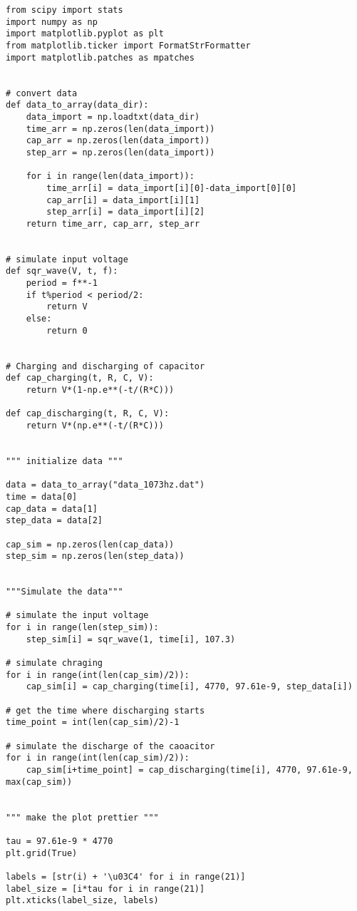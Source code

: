 \begin{verbatim}
from scipy import stats
import numpy as np
import matplotlib.pyplot as plt
from matplotlib.ticker import FormatStrFormatter
import matplotlib.patches as mpatches


# convert data
def data_to_array(data_dir): 
    data_import = np.loadtxt(data_dir)
    time_arr = np.zeros(len(data_import))
    cap_arr = np.zeros(len(data_import))
    step_arr = np.zeros(len(data_import))

    for i in range(len(data_import)):
        time_arr[i] = data_import[i][0]-data_import[0][0]
        cap_arr[i] = data_import[i][1]
        step_arr[i] = data_import[i][2]
    return time_arr, cap_arr, step_arr


# simulate input voltage
def sqr_wave(V, t, f): 
    period = f**-1
    if t%period < period/2:
        return V
    else:
        return 0


# Charging and discharging of capacitor
def cap_charging(t, R, C, V): 
    return V*(1-np.e**(-t/(R*C)))

def cap_discharging(t, R, C, V):
    return V*(np.e**(-t/(R*C))) 


""" initialize data """
    
data = data_to_array("data_1073hz.dat")
time = data[0]
cap_data = data[1]
step_data = data[2]

cap_sim = np.zeros(len(cap_data))
step_sim = np.zeros(len(step_data))


"""Simulate the data"""

# simulate the input voltage
for i in range(len(step_sim)):
    step_sim[i] = sqr_wave(1, time[i], 107.3)

# simulate chraging
for i in range(int(len(cap_sim)/2)):
    cap_sim[i] = cap_charging(time[i], 4770, 97.61e-9, step_data[i])

# get the time where discharging starts
time_point = int(len(cap_sim)/2)-1

# simulate the discharge of the caoacitor
for i in range(int(len(cap_sim)/2)):
    cap_sim[i+time_point] = cap_discharging(time[i], 4770, 97.61e-9, max(cap_sim))
    

""" make the plot prettier """

tau = 97.61e-9 * 4770
plt.grid(True)                     

labels = [str(i) + '\u03C4' for i in range(21)]                     
label_size = [i*tau for i in range(21)]                             
plt.xticks(label_size, labels)                                      


\end{verbatim}
